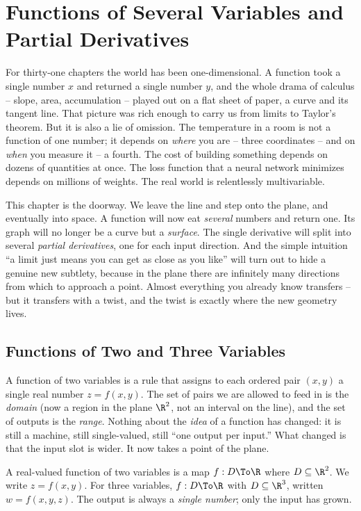 \chapter{Functions of Several Variables and Partial Derivatives}

For thirty-one chapters the world has been one-dimensional. A function took a single
number $x$ and returned a single number $y$, and the whole drama of calculus -- slope,
area, accumulation -- played out on a flat sheet of paper, a curve and its tangent line.
That picture was rich enough to carry us from limits to Taylor's theorem. But it is also a
lie of omission. The temperature in a room is not a function of one number; it depends on
\emph{where} you are -- three coordinates -- and on \emph{when} you measure it -- a fourth.
The cost of building something depends on dozens of quantities at once. The loss function
that a neural network minimizes depends on millions of weights. The real world is
relentlessly multivariable.

This chapter is the doorway. We leave the line and step onto the plane, and eventually into
space. A function will now eat \emph{several} numbers and return one. Its graph will no
longer be a curve but a \emph{surface}. The single derivative will split into several
\emph{partial derivatives}, one for each input direction. And the simple intuition ``a
limit just means you can get as close as you like'' will turn out to hide a genuine new
subtlety, because in the plane there are infinitely many directions from which to approach a
point. Almost everything you already know transfers -- but it transfers with a twist, and
the twist is exactly where the new geometry lives.

\section{Functions of Two and Three Variables}
\label{ch32:sec-functions}

A function of two variables is a rule that assigns to each ordered pair $(x,y)$ a single
real number $z = f(x,y)$. The set of pairs we are allowed to feed in is the \emph{domain}
(now a region in the plane $\R^2$, not an interval on the line), and the set of outputs is
the \emph{range}. Nothing about the \emph{idea} of a function has changed: it is still a
machine, still single-valued, still ``one output per input.'' What changed is that the input
slot is wider. It now takes a point of the plane.

\begin{focusbox}
A real-valued function of two variables is a map $f : D \To \R$ where $D \subseteq \R^2$.
We write $z = f(x,y)$. For three variables, $f : D \To \R$ with $D \subseteq \R^3$, written
$w = f(x,y,z)$. The output is always a \emph{single number}; only the input has grown.
\end{focusbox}

